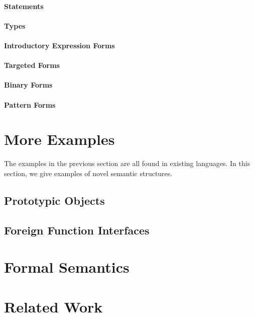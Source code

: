 \documentclass[preprint,10pt]{sigplanconf}
\begin{document}
\paragraph{Statements}

\paragraph{Types}

\paragraph{Introductory Expression Forms}

\paragraph{Targeted Forms}

\paragraph{Binary Forms}

\paragraph{Pattern Forms}

\section{More Examples}\label{sec:more-examples}
The examples in the previous section are all found in existing languages. In this section, we give examples of novel semantic structures.

\subsection{Prototypic Objects}

\subsection{Foreign Function Interfaces}

\section{Formal Semantics}\label{sec:formal-semantics}

\section{Related Work}\label{sec:related-work}
\end{document}
